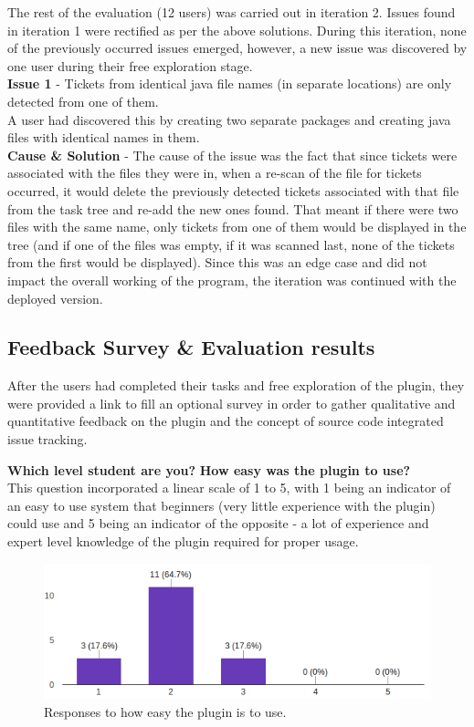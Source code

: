 \documentclass{4thYearProject}
\begin{document}
The rest of the evaluation (12 users) was carried out in iteration 2. Issues found in iteration 1 were rectified as per the above solutions. During this iteration, none of the previously occurred issues emerged, however, a new issue was discovered by one user during their free exploration stage. \\
\newline
\textbf{Issue 1} - Tickets from identical java file names (in separate locations) are only detected from one of them.\\
\newline
A user had discovered this by creating two separate packages and creating java files with identical names in them. \\
\newline
\textbf{Cause \& Solution} - The cause of the issue was the fact that since tickets were associated with the files they were in, when a re-scan of the file for tickets occurred, it would delete the previously detected tickets associated with that file from the task tree and re-add the new ones found. That meant if there were two files with the same name, only tickets from one of them would be displayed in the tree (and if one of the files was empty, if it was scanned last, none of the tickets from the first would be displayed).  Since this was an edge case and did not impact the overall working of the program, the iteration was continued with the deployed version.  

\subsection{Feedback Survey \& Evaluation results}

After the users had completed their tasks and free exploration of the plugin, they were provided a link to fill an optional survey in order to gather qualitative and quantitative feedback on the plugin and the concept of source code integrated issue tracking.

\textbf{Which level student are you?}
\newline
\textbf{How easy was the plugin to use?}\\
This question incorporated a linear scale of 1 to 5, with 1 being an indicator of an easy to use system that beginners (very little experience with the plugin) could use and 5 being an indicator of the opposite - a lot of experience and expert level knowledge of the plugin required for proper usage.   

\begin{figure}[H]
\includegraphics[scale=0.6]{How_easy}
\centering
\caption{Responses to how easy the plugin is to use.}
\label{fig:howeasy}
\end{figure}
\end{document}

